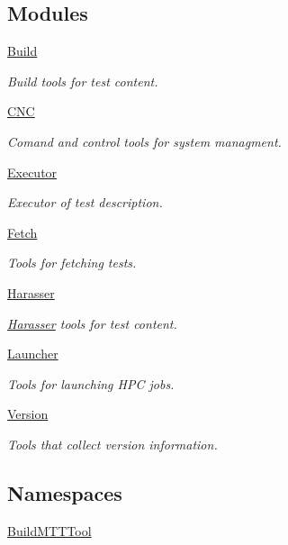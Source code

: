 \subsection*{Modules}
\begin{DoxyCompactItemize}
\item 
\hyperlink{group___build}{Build}
\begin{DoxyCompactList}\small\item\em Build tools for test content. \end{DoxyCompactList}\item 
\hyperlink{group___c_n_c}{C\-N\-C}
\begin{DoxyCompactList}\small\item\em Comand and control tools for system managment. \end{DoxyCompactList}\item 
\hyperlink{group___executor}{Executor}
\begin{DoxyCompactList}\small\item\em Executor of test description. \end{DoxyCompactList}\item 
\hyperlink{group___fetch}{Fetch}
\begin{DoxyCompactList}\small\item\em Tools for fetching tests. \end{DoxyCompactList}\item 
\hyperlink{group___harasser}{Harasser}
\begin{DoxyCompactList}\small\item\em \hyperlink{namespace_harasser}{Harasser} tools for test content. \end{DoxyCompactList}\item 
\hyperlink{group___launcher}{Launcher}
\begin{DoxyCompactList}\small\item\em Tools for launching H\-P\-C jobs. \end{DoxyCompactList}\item 
\hyperlink{group___version}{Version}
\begin{DoxyCompactList}\small\item\em Tools that collect version information. \end{DoxyCompactList}\end{DoxyCompactItemize}
\subsection*{Namespaces}
\begin{DoxyCompactItemize}
\item 
\hyperlink{namespace_build_m_t_t_tool}{Build\-M\-T\-T\-Tool}
\end{DoxyCompactItemize}
